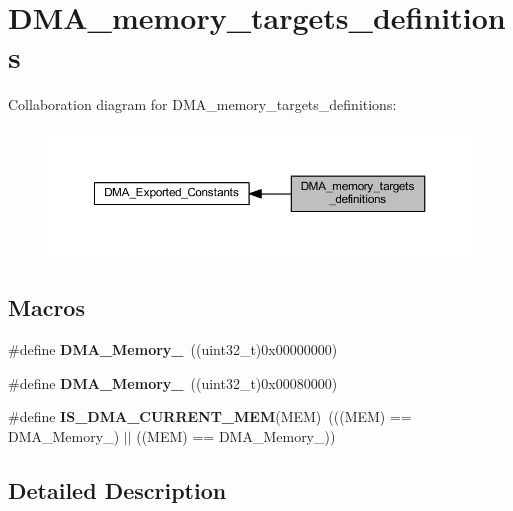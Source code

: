 \hypertarget{group___d_m_a__memory__targets__definitions}{}\section{D\+M\+A\+\_\+memory\+\_\+targets\+\_\+definitions}
\label{group___d_m_a__memory__targets__definitions}
Collaboration diagram for D\+M\+A\+\_\+memory\+\_\+targets\+\_\+definitions\+:\nopagebreak
\begin{figure}[H]
\begin{center}
\leavevmode
\includegraphics[width=350pt]{group___d_m_a__memory__targets__definitions}
\end{center}
\end{figure}
\subsection*{Macros}
\begin{DoxyCompactItemize}
\item 
\mbox{\label{group___d_m_a__memory__targets__definitions_gadb576bccef5f2fc65fe9b451033bdc95}} 
\#define {\bfseries D\+M\+A\+\_\+\+Memory\+\_}~((uint32\+\_\+t)0x00000000)
\item 
\mbox{\label{group___d_m_a__memory__targets__definitions_ga6d1e13631e4ef9a013d078e613fd7fd5}} 
\#define {\bfseries D\+M\+A\+\_\+\+Memory\+\_}~((uint32\+\_\+t)0x00080000)
\item 
\mbox{\label{group___d_m_a__memory__targets__definitions_ga87d6abab18d2b4bb86db909854cc1f02}} 
\#define {\bfseries I\+S\+\_\+\+D\+M\+A\+\_\+\+C\+U\+R\+R\+E\+N\+T\+\_\+\+M\+EM}(M\+EM)~(((M\+EM) == D\+M\+A\+\_\+\+Memory\+\_) $\vert$$\vert$ ((M\+EM) == D\+M\+A\+\_\+\+Memory\+\_))
\end{DoxyCompactItemize}


\subsection{Detailed Description}
